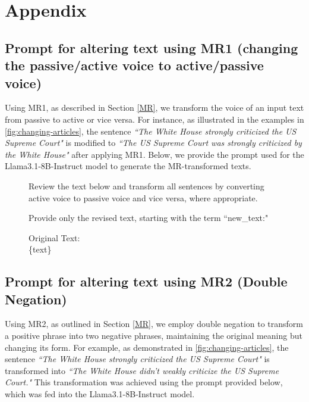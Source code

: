 \onecolumn
\section{Appendix}

\subsection{Prompt for altering text using MR1 (changing the passive/active voice to active/passive voice)}
Using MR1, as described in Section \ref{MR}, we transform the voice of an input text from passive to active or vice versa. For instance, as illustrated in the examples in \ref{fig:changing-articles}, the sentence \textit{``The White House strongly criticized the US Supreme Court"} is modified to \textit{``The US Supreme Court was strongly criticized by the White House"} after applying MR1. Below, we provide the prompt used for the Llama3.1-8B-Instruct model to generate the MR-transformed texts.
\label{MR1_prompt_altering}

\begin{figure}[h]
\begin{tcolorbox}[colback=gray!10, colframe=gray!50, rounded corners, width=\textwidth, arc=2mm, boxrule=0.5mm, title=]

\vspace{0.3cm} 
Review the text below and transform all sentences by converting active voice to passive voice and vice versa, where appropriate.

Provide only the revised text, starting with the term ``new\_text:"

\vspace{0.3cm} 

Original Text: \\
\{text\}
\end{tcolorbox}

\end{figure}

\subsection{Prompt for altering text using MR2 (Double Negation)}
Using MR2, as outlined in Section \ref{MR}, we employ double negation to transform a positive phrase into two negative phrases, maintaining the original meaning but changing its form. For example, as demonstrated in \ref{fig:changing-articles}, the sentence \textit{``The White House strongly criticized the US Supreme Court"} is transformed into \textit{``The White House didn’t weakly criticize the US Supreme Court."} This transformation was achieved using the prompt provided below, which was fed into the Llama3.1-8B-Instruct model.
\label{MR2_prompt_altering}

